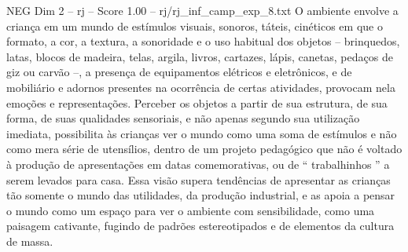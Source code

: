 \begin{textsample}{NEG Dim 2 – rj – Score 1.00 – rj/rj\_inf\_camp\_exp\_8.txt}
O ambiente envolve a criança em um mundo de estímulos visuais, sonoros, táteis, cinéticos em que o formato, a cor, a textura, a sonoridade e o uso habitual dos objetos – brinquedos, latas, blocos de madeira, telas, argila, livros, cartazes, lápis, canetas, pedaços de giz ou carvão –, a presença de equipamentos elétricos e eletrônicos, e de mobiliário e adornos presentes na ocorrência de certas atividades, provocam nela emoções e representações.
Perceber os objetos a partir de sua estrutura, de sua forma, de suas qualidades sensoriais, e não apenas segundo sua utilização imediata, possibilita às crianças ver o mundo como uma soma de estímulos e não como mera série de utensílios, dentro de um projeto pedagógico que não é voltado à produção de apresentações em datas comemorativas, ou de “ trabalhinhos ” a serem levados para casa.
Essa visão supera tendências de apresentar as crianças tão somente o mundo das utilidades, da produção industrial, e as apoia a pensar o mundo como um espaço para ver o ambiente com sensibilidade, como uma paisagem cativante, fugindo de padrões estereotipados e de elementos da cultura de massa.

\end{textsample}
